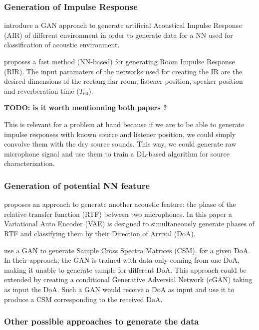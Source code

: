\documentclass{article}
\begin{document}
\subsubsection{Generation of Impulse Response}

\cite{papayiannis2019data} introduce a GAN approach to generate artificial Acoustical Impulse Response (AIR) of different environment in order to generate data for a NN used for classification of acoustic environment.

\cite{ratnarajah2021fast} proposes a fast method (NN-based) for generating Room Impulse Response (RIR). The input paramaters of the networks used for creating the IR are the desired dimensions of the rectangular room, listener position, speaker position and reverberation time ($T_{60}$).

\textbf{TODO: is it worth mentionning both papers ?}

This is relevant for a problem at hand because if we are to be able to generate impulse responses with known source and listener position, we could simply convolve them with the dry source sounds. This way, we could generate raw microphone signal and use them to train a DL-based algorithm for source characterization.


\subsubsection{Generation of potential NN feature}

\cite{bianco2020semi} proposes an approach to generate another acoustic feature: the phase of the relative transfer function (RTF) between two microphones. In this paper a Variational Auto Encoder (VAE) is designed to simultaneously generate phases of RTF and classifying them by their Direction of Arrival (DoA).

\cite{gerstoft2020parametric} use a GAN to generate Sample Cross Spectra Matrices (CSM). for a given DoA. In their approach, the GAN is trained with data only coming from one DoA, making it unable to generate sample for different DoA. This approach could be extended by creating a conditional Generative Adversial Network (cGAN) taking as input the DoA. Such a GAN would receive a DoA as input and use it to produce a CSM corresponding to the received DoA.

\subsubsection{Other possible approaches to generate the data}
\end{document}

